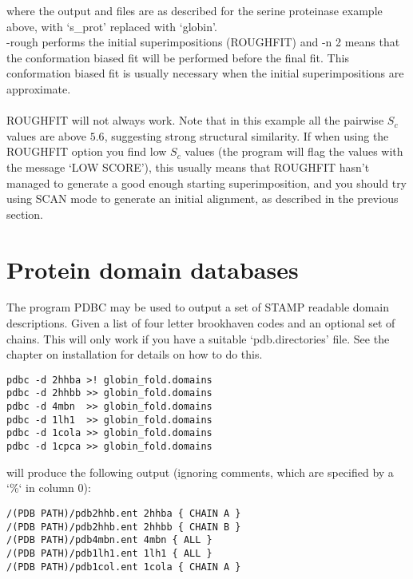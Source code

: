 where the output and files are as described for the serine proteinase example above,
with `s\_prot' replaced with `globin'.\\

-rough performs the initial superimpositions (ROUGHFIT) and -n 2 means that the conformation 
biased fit will be performed before the final fit.  This conformation biased fit is
usually necessary when the initial superimpositions are approximate.\\
\\
ROUGHFIT will not always work.  Note that in this example all the pairwise
$S_{c}$ values are above $5.6$, suggesting strong structural similarity.  If
when using the ROUGHFIT option you find low $S_{c}$ values (the program will
flag the values with the message `LOW SCORE'), this usually means that ROUGHFIT hasn't
managed to generate a good enough starting superimposition, and you should
try using SCAN mode to generate an initial alignment, as described in the previous section. 

\section{Protein domain databases}

The program PDBC may be used to output a set of STAMP readable
domain descriptions.  Given a list of four letter brookhaven
codes and an optional set of chains.  This will only work if you have
a suitable `pdb.directories' file.  See the chapter on installation for details
on how to do this.

\begin{scriptsize}\begin{verbatim}
pdbc -d 2hhba >! globin_fold.domains
pdbc -d 2hhbb >> globin_fold.domains
pdbc -d 4mbn  >> globin_fold.domains
pdbc -d 1lh1  >> globin_fold.domains
pdbc -d 1cola >> globin_fold.domains
pdbc -d 1cpca >> globin_fold.domains
\end{verbatim} \end{scriptsize}

will produce the following output (ignoring comments, which are specified by a `\%`
in column 0):

\begin{scriptsize}\begin{verbatim}
/(PDB PATH)/pdb2hhb.ent 2hhba { CHAIN A }
/(PDB PATH)/pdb2hhb.ent 2hhbb { CHAIN B }
/(PDB PATH)/pdb4mbn.ent 4mbn { ALL }
/(PDB PATH)/pdb1lh1.ent 1lh1 { ALL }
/(PDB PATH)/pdb1col.ent 1cola { CHAIN A }
\end{verbatim} \end{scriptsize}


